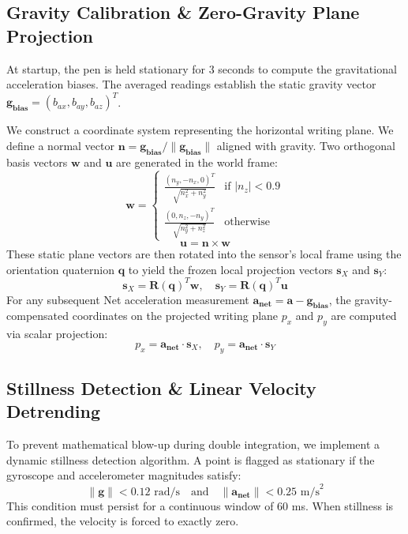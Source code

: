 \documentclass[12pt,a4paper]{article}
\begin{document}
\subsection{Gravity Calibration \& Zero-Gravity Plane Projection}
At startup, the pen is held stationary for 3 seconds to compute the gravitational acceleration biases. The averaged readings establish the static gravity vector $\mathbf{g_{bias}} = (b_{ax}, b_{ay}, b_{az})^T$. 

We construct a coordinate system representing the horizontal writing plane. We define a normal vector $\mathbf{n} = \mathbf{g_{bias}} / \|\mathbf{g_{bias}}\|$ aligned with gravity. Two orthogonal basis vectors $\mathbf{w}$ and $\mathbf{u}$ are generated in the world frame:
\begin{equation}
    \mathbf{w} = \begin{cases}
        \frac{(n_y, -n_x, 0)^T}{\sqrt{n_x^2 + n_y^2}} & \text{if } |n_z| < 0.9 \\
        \frac{(0, n_z, -n_y)^T}{\sqrt{n_y^2 + n_z^2}} & \text{otherwise}
    \end{cases}
\end{equation}
\begin{equation}
    \mathbf{u} = \mathbf{n} \times \mathbf{w}
\end{equation}
These static plane vectors are then rotated into the sensor's local frame using the orientation quaternion $\mathbf{q}$ to yield the frozen local projection vectors $\mathbf{s}_X$ and $\mathbf{s}_Y$:
\begin{equation}
    \mathbf{s}_X = \mathbf{R}(\mathbf{q})^T \mathbf{w}, \quad \mathbf{s}_Y = \mathbf{R}(\mathbf{q})^T \mathbf{u}
\end{equation}
For any subsequent Net acceleration measurement $\mathbf{a_{net}} = \mathbf{a} - \mathbf{g_{bias}}$, the gravity-compensated coordinates on the projected writing plane $p_x$ and $p_y$ are computed via scalar projection:
\begin{equation}
    p_x = \mathbf{a_{net}} \cdot \mathbf{s}_X, \quad p_y = \mathbf{a_{net}} \cdot \mathbf{s}_Y
\end{equation}

\subsection{Stillness Detection \& Linear Velocity Detrending}
To prevent mathematical blow-up during double integration, we implement a dynamic stillness detection algorithm. A point is flagged as stationary if the gyroscope and accelerometer magnitudes satisfy:
\begin{equation}
    \|\mathbf{g}\| < 0.12 \text{ rad/s} \quad \text{and} \quad \|\mathbf{a_{net}}\| < 0.25 \text{ m/s}^2
\end{equation}
This condition must persist for a continuous window of $60$ ms. When stillness is confirmed, the velocity is forced to exactly zero.
\end{document}
